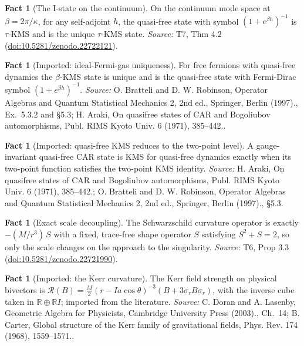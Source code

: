 \documentclass[11pt]{article}
\theoremstyle{definition}
\newtheorem{fact}[theorem]{Fact}
\theoremstyle{plain}
\providecommand{\R}{}\renewcommand{\R}{\mathbb{R}}
\begin{document}
\begin{fact}[The I-state on the continuum]\label{c:hawking.i-state-continuum}
On the continuum mode space at $\beta = 2\pi/\kappa$, for any self-adjoint $h$, the quasi-free state with symbol $(1 + e^{\beta h})^{-1}$ is $\tau$-KMS and is the unique $\tau$-KMS state.
\emph{Source:} T7, Thm 4.2 (\href{https://doi.org/10.5281/zenodo.22722121}{doi:10.5281/zenodo.22722121}).
\end{fact}

\begin{fact}[Imported: ideal-Fermi-gas uniqueness]\label{c:hawking.imported-ideal-fermi-gas-uniqueness}
For free fermions with quasi-free dynamics the $\beta$-KMS state is unique and is the quasi-free state with Fermi-Dirac symbol $(1 + e^{\beta h})^{-1}$.
\emph{Source:} O. Bratteli and D. W. Robinson, Operator Algebras and Quantum Statistical Mechanics 2, 2nd ed., Springer, Berlin (1997)., Ex.~5.3.2 and \S 5.3; H. Araki, On quasifree states of CAR and Bogoliubov automorphisms, Publ. RIMS Kyoto Univ. 6 (1971), 385--442..
\end{fact}

\begin{fact}[Imported: quasi-free KMS reduces to the two-point level]\label{c:hawking.imported-quasi-free-kms-reduces-two}
A gauge-invariant quasi-free CAR state is KMS for quasi-free dynamics exactly when its two-point function satisfies the two-point KMS identity.
\emph{Source:} H. Araki, On quasifree states of CAR and Bogoliubov automorphisms, Publ. RIMS Kyoto Univ. 6 (1971), 385--442.; O. Bratteli and D. W. Robinson, Operator Algebras and Quantum Statistical Mechanics 2, 2nd ed., Springer, Berlin (1997)., \S 5.3.
\end{fact}

\begin{fact}[Exact scale decoupling]\label{c:interior.exact-scale-decoupling}
The Schwarzschild curvature operator is exactly $-(M/r^3)\,S$ with a fixed, trace-free shape operator $S$ satisfying $S^2 + S = 2$, so only the scale changes on the approach to the singularity.
\emph{Source:} T6, Prop 3.3 (\href{https://doi.org/10.5281/zenodo.22721990}{doi:10.5281/zenodo.22721990}).
\end{fact}

\begin{fact}[Imported: the Kerr curvature]\label{c:interior.imported-kerr-curvature}
The Kerr field strength on physical bivectors is $\mathcal{R}(B) = \tfrac{M}{2}(r - Ia\cos\theta)^{-3}(B + 3\sigma_r B\sigma_r)$, with the inverse cube taken in $\R \oplus \R I$; imported from the literature.
\emph{Source:} C. Doran and A. Lasenby, Geometric Algebra for Physicists, Cambridge University Press (2003)., Ch.~14; B. Carter, Global structure of the Kerr family of gravitational fields, Phys. Rev. 174 (1968), 1559--1571..
\end{fact}
\end{document}
